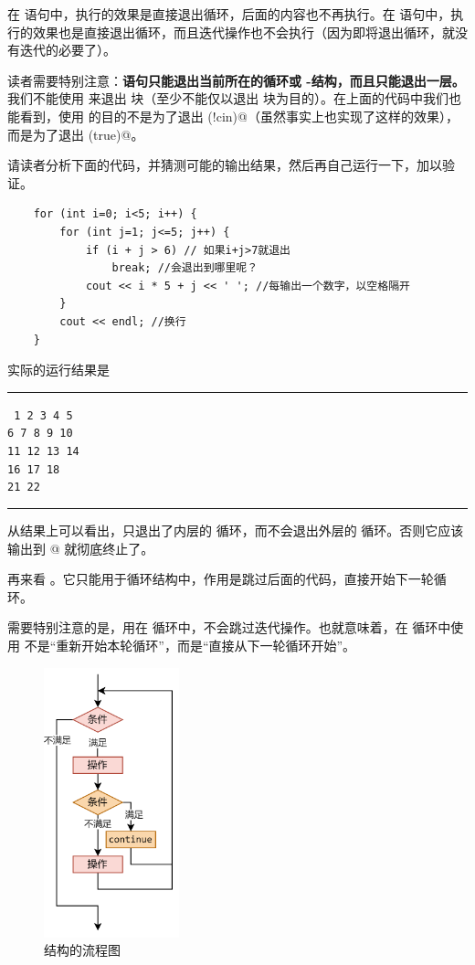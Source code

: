 在 \lstinline@while@ 语句中，\lstinline@break@ 执行的效果是直接退出循环，后面的内容也不再执行。在 \lstinline@for@ 语句中，\lstinline@break@ 执行的效果也是直接退出循环，而且迭代操作也不会执行（因为即将退出循环，就没有迭代的必要了）。\par
读者需要特别注意：\textbf{\lstinline@break@ 语句只能退出当前所在的循环或 \lstinline@switch@-\lstinline@case@ 结构，而且只能退出一层。}我们不能使用 \lstinline@break@ 来退出 \lstinline@if@ 块（至少不能仅以退出 \lstinline@if@ 块为目的）。在上面的代码中我们也能看到，使用 \lstinline@break@ 的目的不是为了退出 \lstinline@if(!cin)@（虽然事实上也实现了这样的效果），而是为了退出 \lstinline@while(true)@。\par
请读者分析下面的代码，并猜测可能的输出结果，然后再自己运行一下，加以验证。
\begin{lstlisting}
    for (int i=0; i<5; i++) {
        for (int j=1; j<=5; j++) {
            if (i + j > 6) // 如果i+j>7就退出
                break; //会退出到哪里呢？
            cout << i * 5 + j << ' '; //每输出一个数字，以空格隔开
        }
        cout << endl; //换行
    }
\end{lstlisting}
实际的运行结果是\\\noindent\rule{\linewidth}{0.2pt}\texttt{
1 2 3 4 5\\
6 7 8 9 10\\
11 12 13 14\\
16 17 18\\
21 22
}\\\noindent\rule{\linewidth}{0.2pt}
从结果上可以看出，\lstinline@break@ 只退出了内层的 \lstinline@for@ 循环，而不会退出外层的 \lstinline@for@ 循环。否则它应该输出到 @ 就彻底终止了。\par
再来看 \lstinline@continue@。它只能用于循环结构中，作用是跳过后面的代码，直接开始下一轮循环。\par
需要特别注意的是，\lstinline@continue@ 用在 \lstinline@for@ 循环中，不会跳过迭代操作。也就意味着，在 \lstinline@for@ 循环中使用 \lstinline@continue@ 不是``重新开始本轮循环''，而是``直接从下一轮循环开始''。\par
\begin{figure}[htbp]
   \centering
   \includegraphics[width=0.35\textwidth]{../images/generalized_parts/03_structure_of_continue.png}
   \caption{\lstinline@continue@ 结构的流程图}
\end{figure}
